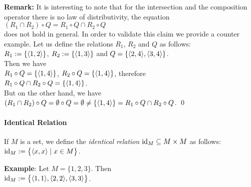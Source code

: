 \noindent
\textbf{Remark:}
It is interesting to note that for the intersection and the composition operator
there is no law of distributivity, the equation
\\[0.2cm]
\hspace*{1.3cm}
$(R_1 \cap R_2) \circ Q = R_1 \circ Q \cap R_2 \circ Q$
\\[0.2cm]
does not hold in general.  In order to validate this claim we provide a counter example.
Let us define the relations $R_1$, $R_2$ and $Q$ as follows: \\[0.2cm]
\hspace*{1.3cm} $R_1 := \{ \pair(1,2) \}$, \quad $R_2 := \{ \pair(1,3) \}$ \quad and \quad
                $Q = \{ \pair(2,4), \pair(3,4) \}$. \\[0.2cm]
Then we have \\[0.2cm]
\hspace*{1.3cm} $R_1 \circ Q = \{ \pair(1,4) \}$, \quad $R_2 \circ Q = \{ \pair(1,4) \}$,
\quad therefore 
\\[0.2cm]
\hspace*{1.3cm}
                $R_1 \circ Q \cap R_2 \circ Q = \{ \pair(1,4) \}$. \\[0.2cm]
But on the other hand, we have  \\[0.2cm]
\hspace*{1.3cm} 
$(R_1 \cap R_2) \circ Q  = \emptyset \circ Q = \emptyset \not=
\{\pair(1,4) \} = R_1 \circ Q  \cap R_2 \circ Q$. 
\qed

\paragraph{Identical Relation} If  $M$ is a set, we define the \emph{identical relation} $\textrm{id}_M \subseteq M \times M$
as follows: \\[0.2cm]
\hspace*{1.3cm} $\id_M := \bigl\{ \pair(x,x) \mid x \in M \bigr\}$. 
\vspace*{0.2cm}

\noindent
\textbf{Example}: Let $M = \{1,2,3\}$.  Then \\[0.2cm]
\hspace*{1.3cm}  $\id_M := \bigl\{ \pair(1,1),  \pair(2,2),  \pair(3,3) \bigr\}$.
\vspace*{0.2cm}

